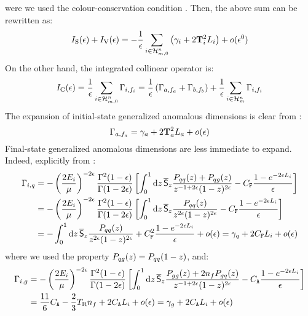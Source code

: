 were we used the colour-conservation condition . Then, the above sum can be rewritten as:
\begin{equation}
  I_\text{S}(\epsilon) + I_\text{V}(\epsilon) = - \frac{1}{\epsilon} \sum_{i \in \mathcal{H}^{n}_{m,0}} \left( \gamma_i + 2 \mathbf{T}_i^2 L_i \right) + o(\epsilon^0)
\end{equation}
On the other hand, the integrated collinear operator is:
\begin{equation*}
  I_\text{C}(\epsilon) = \frac{1}{\epsilon} \sum_{i \in \mathcal{H}^{n}_{m,0}} \Gamma_{i , f_i} = \frac{1}{\epsilon} \left( \Gamma_{a , f_a} + \Gamma_{b , f_b} \right) + \frac{1}{\epsilon} \sum_{i \in \mathcal{H}^{n}_{m}} \Gamma_{i , f_i}
\end{equation*}
The expansion of initial-state generalized anomalous dimensions is clear from :
\begin{equation}
  \Gamma_{a , f_a} = \gamma_a + 2 \mathbf{T}_a^2 L_a + o(\epsilon)
  \label{eq:gen-ad}
\end{equation}
Final-state generalized anomalous dimensions are less immediate to expand. Indeed, explicitly from :
\begin{equation*}
  \begin{split}
    \Gamma_{i , q}
    & = - \left( \frac{2E_i}{\mu} \right)^{-2\epsilon} \frac{\Gamma^2(1-\epsilon)}{\Gamma(1-2\epsilon)} \left[ \int_0^1 \mathrm{d} z\, \overline{\mathsf{S}}_z \frac{P_{qq}(z) + P_{qg}(z)}{z^{-1 + 2\epsilon} (1-z)^{2\epsilon}} - C_\mathtt{F} \frac{1 - e^{-2\epsilon L_i}}{\epsilon} \right] \\
    & = - \left( \frac{2E_i}{\mu} \right)^{-2\epsilon} \frac{\Gamma^2(1-\epsilon)}{\Gamma(1-2\epsilon)} \left[ \int_0^1 \mathrm{d} z\, \overline{\mathsf{S}}_z \frac{P_{qq}(z)}{z^{2\epsilon} (1-z)^{2\epsilon}} - C_\mathtt{F} \frac{1 - e^{-2\epsilon L_i}}{\epsilon} \right] \\
    & = - \int_0^1 \mathrm{d} z\, \overline{\mathsf{S}}_z \frac{P_{qq}(z)}{z^{2\epsilon} (1-z)^{2\epsilon}} + C_\mathtt{F}^2 \frac{1 - e^{-2\epsilon L_i}}{\epsilon} + o(\epsilon) = \gamma_q + 2 C_\mathtt{F} L_i + o(\epsilon)
  \end{split}
\end{equation*}
where we used the property $ P_{qg}(z) = P_{qq}(1 - z) $, and:
\begin{equation*}
  \begin{split}
    \Gamma_{i , g}
    & = - \left( \frac{2E_i}{\mu} \right)^{-2\epsilon} \frac{\Gamma^2(1-\epsilon)}{\Gamma(1-2\epsilon)} \left[ \int_0^1 \mathrm{d} z\, \overline{\mathsf{S}}_z \frac{P_{gg}(z) + 2n_f P_{gq}(z)}{z^{-1+2\epsilon}(1-z)^{2\epsilon}} - C_\mathtt{A} \frac{1 - e^{-2\epsilon L_i}}{\epsilon} \right] \\
    & = \frac{11}{6} C_\mathtt{A} - \frac{2}{3} T_\text{R} n_f + 2 C_\mathtt{A} L_i + o(\epsilon) = \gamma_g + 2 C_\mathtt{A} L_i + o(\epsilon)
  \end{split}
\end{equation*}
